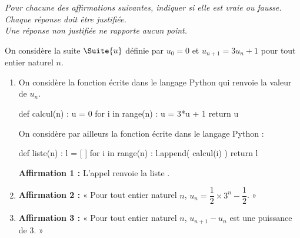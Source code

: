\emph{Pour chacune des affirmations suivantes, indiquer si elle est vraie ou fausse.\\
Chaque réponse doit être justifiée.\\
Une réponse non justifiée ne rapporte aucun point.}

\bigskip

On considère la suite $\Suite{u}$ définie par $u_0 = 0$ et $u_{n+1} = 3u_n+1$ pour tout entier naturel $n$.

\begin{enumerate}
	\item On considère la fonction  écrite dans le langage \textsf{Python} qui renvoie la valeur de $u_n$.
	
	\begin{CodePiton}[Alignement=center,Largeur=8cm,Gobble=tabs]{}
	def calcul(n) :
		u = 0
		for i in range(n) :
			u = 3*u + 1
		return u
	\end{CodePiton}
	
	On considère par ailleurs la fonction  écrite dans le langage \textsf{Python} :
	
	\begin{CodePiton}[Alignement=center,Largeur=8cm,Gobble=tabs]{}
	def liste(n) :
		l = [ ]
		for i in range(n) :
			l.append( calcul(i) )
		return l
	\end{CodePiton}
	
	\medskip
	
	\textbf{Affirmation 1 :} \og L'appel  renvoie la liste \piton{[0, 1, 4, 13, 42, 121]}. \fg
	\item \textbf{Affirmation 2 :} « Pour tout entier naturel $n$, $u_n = \dfrac12 \times 3^n - \dfrac12$. »
	\item \textbf{Affirmation 3 :} « Pour tout entier naturel $n$, $u_{n+1}-u_n$ est une puissance de 3. »
\end{enumerate}